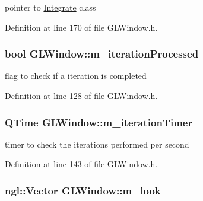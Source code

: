pointer to \hyperlink{class_integrate}{Integrate} class 



Definition at line 170 of file GLWindow.h.

\hypertarget{class_g_l_window_a79f6f10959fa411711c21f937ff96a72}{
\subsubsection[{m\_\-iterationProcessed}]{\setlength{\rightskip}{0pt plus 5cm}bool {\bf GLWindow::m\_\-iterationProcessed}}}
\label{class_g_l_window_a79f6f10959fa411711c21f937ff96a72}


flag to check if a iteration is completed 



Definition at line 128 of file GLWindow.h.

\hypertarget{class_g_l_window_aba81e4d4f6b0cece757626a9a23f3415}{
\subsubsection[{m\_\-iterationTimer}]{\setlength{\rightskip}{0pt plus 5cm}QTime {\bf GLWindow::m\_\-iterationTimer}}}
\label{class_g_l_window_aba81e4d4f6b0cece757626a9a23f3415}


timer to check the iterations performed per second 



Definition at line 143 of file GLWindow.h.

\hypertarget{class_g_l_window_acb8385bfb1f1fcbaafe890aabf51055b}{
\subsubsection[{m\_\-look}]{\setlength{\rightskip}{0pt plus 5cm}ngl::Vector {\bf GLWindow::m\_\-look}}}
\label{class_g_l_window_acb8385bfb1f1fcbaafe890aabf51055b}


